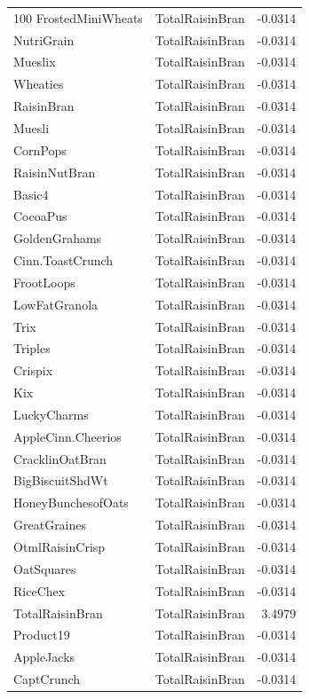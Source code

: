 \begin{longtable}{llr}
100%
FrostedMiniWheats & TotalRaisinBran & -0.0314 \\
NutriGrain & TotalRaisinBran & -0.0314 \\
Mueslix & TotalRaisinBran & -0.0314 \\
Wheaties & TotalRaisinBran & -0.0314 \\
RaisinBran & TotalRaisinBran & -0.0314 \\
Muesli & TotalRaisinBran & -0.0314 \\
CornPops & TotalRaisinBran & -0.0314 \\
RaisinNutBran & TotalRaisinBran & -0.0314 \\
Basic4 & TotalRaisinBran & -0.0314 \\
CocoaPus & TotalRaisinBran & -0.0314 \\
GoldenGrahams & TotalRaisinBran & -0.0314 \\
Cinn.ToastCrunch & TotalRaisinBran & -0.0314 \\
FrootLoops & TotalRaisinBran & -0.0314 \\
LowFatGranola & TotalRaisinBran & -0.0314 \\
Trix & TotalRaisinBran & -0.0314 \\
Triples & TotalRaisinBran & -0.0314 \\
Crispix & TotalRaisinBran & -0.0314 \\
Kix & TotalRaisinBran & -0.0314 \\
LuckyCharms & TotalRaisinBran & -0.0314 \\
AppleCinn.Cheerios & TotalRaisinBran & -0.0314 \\
CracklinOatBran & TotalRaisinBran & -0.0314 \\
BigBiscuitShdWt & TotalRaisinBran & -0.0314 \\
HoneyBunchesofOats & TotalRaisinBran & -0.0314 \\
GreatGraines & TotalRaisinBran & -0.0314 \\
OtmlRaisinCrisp & TotalRaisinBran & -0.0314 \\
OatSquares & TotalRaisinBran & -0.0314 \\
RiceChex & TotalRaisinBran & -0.0314 \\
TotalRaisinBran & TotalRaisinBran & 3.4979 \\
Product19 & TotalRaisinBran & -0.0314 \\
AppleJacks & TotalRaisinBran & -0.0314 \\
CaptCrunch & TotalRaisinBran & -0.0314 \\

\end{longtable}
